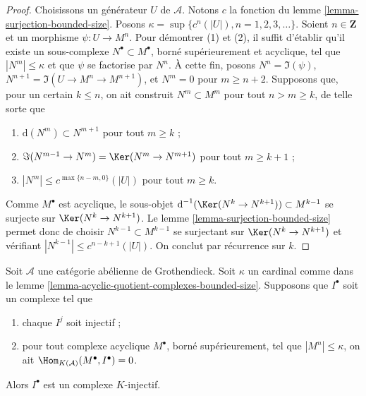 \begin{proof}
Choisissons un générateur $U$ de $\mathcal{A}$. Notons $c$ la fonction du
lemme \ref{lemma-surjection-bounded-size}.
Posons $\kappa = \sup \{c^n(|U|), n = 1, 2, 3, \ldots\}$.
Soient $n \in \mathbf{Z}$ et un morphisme $\psi : U \to M^n$.
Pour démontrer (1) et (2), il suffit d'établir qu'il existe un sous-complexe
$N^\bullet \subset M^\bullet$, borné supérieurement et acyclique, tel que
$|N^m| \leq \kappa$ et que $\psi$ se factorise par $N^n$.
À cette fin, posons $N^n = \Im(\psi)$,
$N^{n + 1} = \Im(U \to M^n \to M^{n + 1})$, et $N^m = 0$ pour
$m \geq n + 2$.
Supposons que, pour un certain $k \leq n$, on ait construit
$N^m \subset M^m$ pour tout $n > m \geq k$, de telle sorte que
\begin{enumerate}
\item $\text{d}(N^m) \subset N^{m + 1}$ pour tout $m \geq k$ ;
\item $\Im(N^{m - 1} \to N^m) = \Ker(N^m \to N^{m + 1})$ pour
tout $m \geq k + 1$ ;
\item $|N^m| \leq c^{\max\{n - m, 0\}}(|U|)$ pour tout $m \geq k$.
\end{enumerate}
Comme $M^\bullet$ est acyclique, le sous-objet
$\text{d}^{-1}(\Ker(N^k \to N^{k + 1})) \subset M^{k - 1}$ se surjecte sur
$\Ker(N^k \to N^{k + 1})$. Le
lemme \ref{lemma-surjection-bounded-size} permet donc de choisir
$N^{k - 1} \subset M^{k - 1}$ se surjectant sur
$\Ker(N^k \to N^{k + 1})$ et vérifiant
$|N^{k - 1}| \leq c^{n - k + 1}(|U|)$.
On conclut par récurrence sur $k$.
\end{proof}

\begin{lemma}
\label{lemma-characterize-K-injective}
Soit $\mathcal{A}$ une catégorie abélienne de Grothendieck.
Soit $\kappa$ un cardinal comme dans le
lemme \ref{lemma-acyclic-quotient-complexes-bounded-size}.
Supposons que $I^\bullet$ soit un complexe tel que
\begin{enumerate}
\item chaque $I^j$ soit injectif ;
\item pour tout complexe acyclique $M^\bullet$, borné supérieurement,
tel que $|M^n| \leq \kappa$, on ait
$\Hom_{K(\mathcal{A})}(M^\bullet, I^\bullet) = 0$.
\end{enumerate}
Alors $I^\bullet$ est un complexe $K$-injectif.
\end{lemma}

